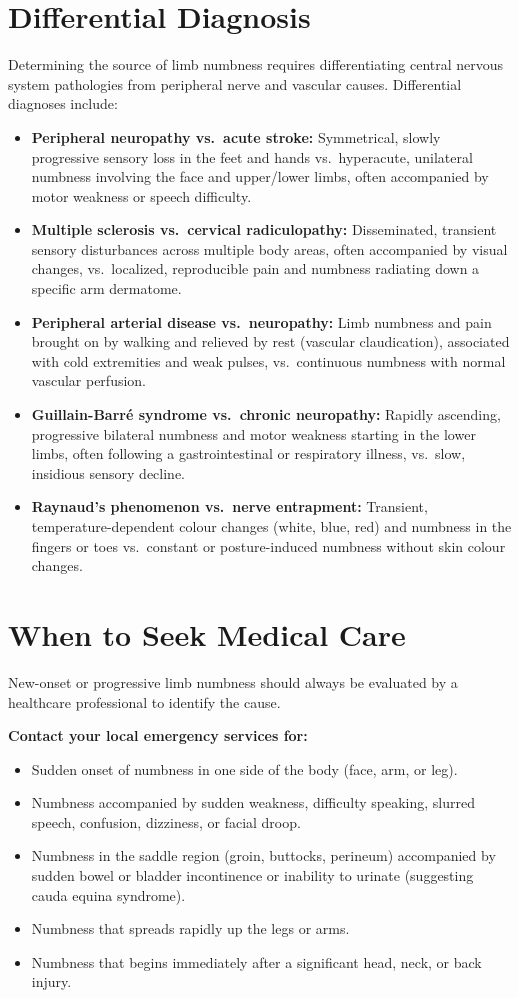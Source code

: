 \section*{Differential Diagnosis}
Determining the source of limb numbness requires differentiating central nervous system pathologies from peripheral nerve and vascular causes. Differential diagnoses include:

\begin{itemize}
    \item \textbf{Peripheral neuropathy vs.\ acute stroke:} Symmetrical, slowly progressive sensory loss in the feet and hands vs.\ hyperacute, unilateral numbness involving the face and upper/lower limbs, often accompanied by motor weakness or speech difficulty.
    \item \textbf{Multiple sclerosis vs.\ cervical radiculopathy:} Disseminated, transient sensory disturbances across multiple body areas, often accompanied by visual changes, vs.\ localized, reproducible pain and numbness radiating down a specific arm dermatome.
    \item \textbf{Peripheral arterial disease vs.\ neuropathy:} Limb numbness and pain brought on by walking and relieved by rest (vascular claudication), associated with cold extremities and weak pulses, vs.\ continuous numbness with normal vascular perfusion.
    \item \textbf{Guillain-Barré syndrome vs.\ chronic neuropathy:} Rapidly ascending, progressive bilateral numbness and motor weakness starting in the lower limbs, often following a gastrointestinal or respiratory illness, vs.\ slow, insidious sensory decline.
    \item \textbf{Raynaud's phenomenon vs.\ nerve entrapment:} Transient, temperature-dependent colour changes (white, blue, red) and numbness in the fingers or toes vs.\ constant or posture-induced numbness without skin colour changes.
\end{itemize}

\section*{When to Seek Medical Care}
New-onset or progressive limb numbness should always be evaluated by a healthcare professional to identify the cause.

\textbf{Contact your local emergency services for:}
\begin{itemize}
    \item Sudden onset of numbness in one side of the body (face, arm, or leg).
    \item Numbness accompanied by sudden weakness, difficulty speaking, slurred speech, confusion, dizziness, or facial droop.
    \item Numbness in the saddle region (groin, buttocks, perineum) accompanied by sudden bowel or bladder incontinence or inability to urinate (suggesting cauda equina syndrome).
    \item Numbness that spreads rapidly up the legs or arms.
    \item Numbness that begins immediately after a significant head, neck, or back injury.
\end{itemize}

